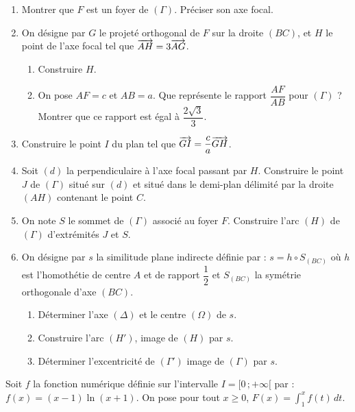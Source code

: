 \documentclass[11pt]{article}
\begin{document}
\begin{enumerate}[start=5]
  \item Montrer que $F$ est un foyer de $(\Gamma)$. Préciser son axe focal.
  \item On désigne par $G$ le projeté orthogonal de $F$ sur la droite $(BC)$, et $H$ le point de l'axe focal tel que $\overrightarrow{AH} = 3\overrightarrow{AG}$.
  \begin{enumerate}[label=\alph*.]
    \item Construire $H$.
    \item On pose $AF = c$ et $AB = a$. Que représente le rapport $\dfrac{AF}{AB}$ pour $(\Gamma)$ ? Montrer que ce rapport est égal à $\dfrac{2\sqrt{3}}{3}$.
  \end{enumerate}
  \item Construire le point $I$ du plan tel que $\overrightarrow{GI} = \dfrac{c}{a}\overrightarrow{GH}$.
  \item Soit $(d)$ la perpendiculaire à l'axe focal passant par $H$. Construire le point $J$ de $(\Gamma)$ situé sur $(d)$ et situé dans le demi-plan délimité par la droite $(AH)$ contenant le point $C$.
  \item On note $S$ le sommet de $(\Gamma)$ associé au foyer $F$. Construire l'arc $(H)$ de $(\Gamma)$ d'extrémités $J$ et $S$.
  \item On désigne par $s$ la similitude plane indirecte définie par : $s = h \circ S_{(BC)}$ où $h$ est l'homothétie de centre $A$ et de rapport $\dfrac{1}{2}$ et $S_{(BC)}$ la symétrie orthogonale d'axe $(BC)$.
  \begin{enumerate}[label=\alph*.]
    \item Déterminer l'axe $(\Delta)$ et le centre $(\Omega)$ de $s$.
    \item Construire l'arc $(H')$, image de $(H)$ par $s$.
    \item Déterminer l'excentricité de $(\Gamma')$ image de $(\Gamma)$ par $s$.
  \end{enumerate}
\end{enumerate}


Soit $f$ la fonction numérique définie sur l'intervalle $I = [0\,;+\infty[$ par : $f(x) = (x-1)\ln(x+1)$. On pose pour tout $x \ge 0$, $F(x) = \displaystyle\int_1^x f(t)\,dt$.
\end{document}
